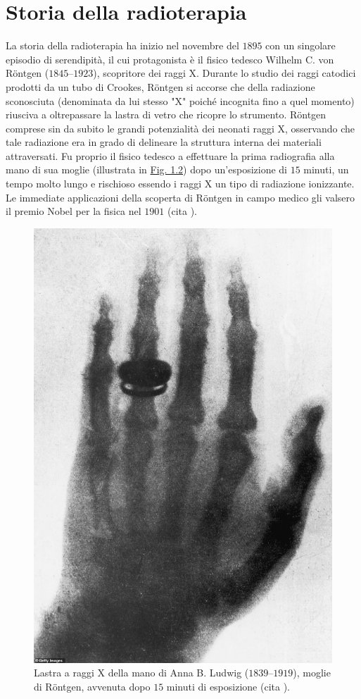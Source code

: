 \documentclass[12pt,a4paper,twoside]{report}
\begin{document}
	\section{Storia della radioterapia}
	La storia della radioterapia ha inizio nel novembre del $1895$ con un singolare episodio di serendipità, il cui protagonista è il fisico tedesco Wilhelm C. von Röntgen ($1845$--$1923$), scopritore dei raggi X. Durante lo studio dei raggi catodici prodotti da un tubo di Crookes, Röntgen si accorse che della radiazione sconosciuta (denominata da lui stesso "X" poiché incognita fino a quel momento) riusciva a oltrepassare la lastra di vetro che ricopre lo strumento. Röntgen comprese sin da subito le grandi potenzialità dei neonati raggi X, osservando che tale radiazione era in grado di delineare la struttura interna dei materiali attraversati. Fu proprio il fisico tedesco a effettuare la prima radiografia alla mano di sua moglie (illustrata in \hyperref[fig:rongten]{Fig. 1.2}) dopo un'esposizione di $15$ minuti, un tempo molto lungo e rischioso essendo i raggi X un tipo di radiazione ionizzante. Le immediate applicazioni della scoperta di Röntgen in campo medico gli valsero il premio Nobel per la fisica nel $1901$ (cita
	).
	
	\begin{figure}[H]
		\centering
		\includegraphics[width=0.5\linewidth]{rongten.jpg}
		\caption{Lastra a raggi X della mano di Anna B. Ludwig ($1839$--$1919$), moglie di Röntgen, avvenuta dopo $15$ minuti di esposizione (cita
			).}
		\label{fig:rongten}
	\end{figure}
	
\end{document}
